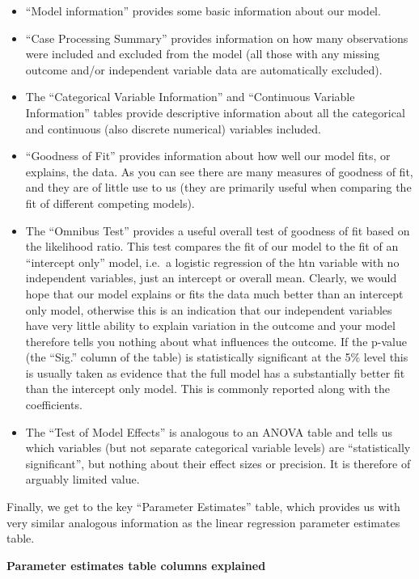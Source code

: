 \documentclass[
]{book}
\begin{document}
\begin{itemize}
\item
  ``Model information'' provides some basic information about our model.
\item
  ``Case Processing Summary'' provides information on how many observations were included and excluded from the model (all those with any missing outcome and/or independent variable data are automatically excluded).
\item
  The ``Categorical Variable Information'' and ``Continuous Variable Information'' tables provide descriptive information about all the categorical and continuous (also discrete numerical) variables included.
\item
  ``Goodness of Fit'' provides information about how well our model fits, or explains, the data. As you can see there are many measures of goodness of fit, and they are of little use to us (they are primarily useful when comparing the fit of different competing models).
\item
  The ``Omnibus Test'' provides a useful overall test of goodness of fit based on the likelihood ratio. This test compares the fit of our model to the fit of an ``intercept only'' model, i.e.~a logistic regression of the htn variable with no independent variables, just an intercept or overall mean. Clearly, we would hope that our model explains or fits the data much better than an intercept only model, otherwise this is an indication that our independent variables have very little ability to explain variation in the outcome and your model therefore tells you nothing about what influences the outcome. If the p-value (the ``Sig.'' column of the table) is statistically significant at the 5\% level this is usually taken as evidence that the full model has a substantially better fit than the intercept only model. This is commonly reported along with the coefficients.
\item
  The ``Test of Model Effects'' is analogous to an ANOVA table and tells us which variables (but not separate categorical variable levels) are ``statistically significant'', but nothing about their effect sizes or precision. It is therefore of arguably limited value.
\end{itemize}

Finally, we get to the key ``Parameter Estimates'' table, which provides us with very similar analogous information as the linear regression parameter estimates table.

\textbf{Parameter estimates table columns explained}
\end{document}
